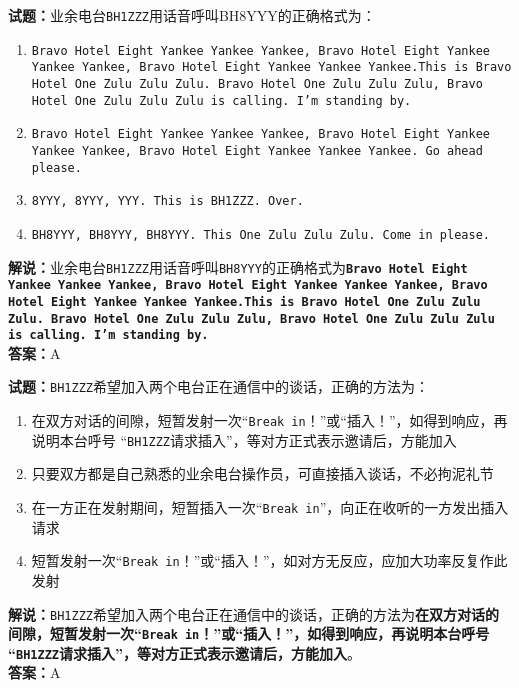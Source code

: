 \documentclass{ctexbook}
\begin{document}
\noindent\textbf{试题：}业余电台\texttt{BH1ZZZ}用话音呼叫BH8YYY的正确格式为：
\begin{enumerate}[leftmargin=3em]
	\item \texttt{Bravo Hotel Eight Yankee Yankee Yankee, Bravo Hotel Eight Yankee Yankee Yankee, Bravo Hotel Eight Yankee Yankee Yankee.This is Bravo Hotel One Zulu Zulu Zulu. Bravo Hotel One Zulu Zulu Zulu, Bravo Hotel One Zulu Zulu Zulu is calling. I’m standing by.}
	\item \texttt{Bravo Hotel Eight Yankee Yankee Yankee, Bravo Hotel Eight Yankee Yankee Yankee, Bravo Hotel Eight Yankee Yankee Yankee. Go ahead please.}
	\item \texttt{8YYY, 8YYY, YYY. This is BH1ZZZ. Over.}
	\item \texttt{BH8YYY, BH8YYY, BH8YYY. This One Zulu Zulu Zulu. Come in please.}
\end{enumerate}
\noindent\textbf{解说：}业余电台\texttt{BH1ZZZ}用话音呼叫\texttt{BH8YYY}的正确格式为\texttt{\textbf{Bravo Hotel Eight Yankee Yankee Yankee, Bravo Hotel Eight Yankee Yankee Yankee, Bravo Hotel Eight Yankee Yankee Yankee.This is Bravo Hotel One Zulu Zulu Zulu. Bravo Hotel One Zulu Zulu Zulu, Bravo Hotel One Zulu Zulu Zulu is calling. I’m standing by.}}\cite{icao}\cite[49]{yeyuwuxiandiantongxin}\\
\noindent\textbf{答案：}A


\bigskip


\noindent\textbf{试题：}\texttt{BH1ZZZ}希望加入两个电台正在通信中的谈话，正确的方法为：
\begin{enumerate}[leftmargin=3em]
	\item 在双方对话的间隙，短暂发射一次“\texttt{Break in}！”或“插入！”，如得到响应，再说明本台呼号 “\texttt{BH1ZZZ}请求插入”，等对方正式表示邀请后，方能加入
	\item 只要双方都是自己熟悉的业余电台操作员，可直接插入谈话，不必拘泥礼节
	\item 在一方正在发射期间，短暂插入一次“\texttt{Break in}”，向正在收听的一方发出插入请求
	\item 短暂发射一次“\texttt{Break in}！”或“插入！”，如对方无反应，应加大功率反复作此发射
\end{enumerate}
\noindent\textbf{解说：}\texttt{BH1ZZZ}希望加入两个电台正在通信中的谈话，正确的方法为\textbf{在双方对话的间隙，短暂发射一次“\texttt{Break in}！”或“插入！”，如得到响应，再说明本台呼号 “\texttt{BH1ZZZ}请求插入”，等对方正式表示邀请后，方能加入}。\\
\noindent\textbf{答案：}A
\end{document}
